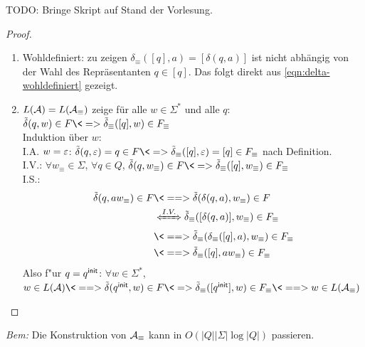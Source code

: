 TODO: Bringe Skript auf Stand der Vorlesung.

\begin{proof}\ 
        \begin{enumerate}
                \item Wohldefiniert: zu zeigen $\delta_\equiv([q],a) =[\delta(q,a)]$ ist nicht abhängig von der Wahl des Repräsentanten $q\in [q]$. Das folgt direkt aus \autoref{eqn:delta-wohldefiniert} gezeigt.
                \item $L(\mathcal{A})=L(\mathcal{A}_\equiv)$ zeige für alle $w\in\Sigma^*$ und alle $q$: $\tilde\delta(q,w)\in F \<=> \tilde\delta_\equiv([q],w)\in F_\equiv$\\
                Induktion über $w$:\\
                I.A. $w=\varepsilon$: $\tilde\delta(q,\Eps)=q\in F \<=> \tilde\delta_\equiv([q],\Eps)=[q]\in F_\equiv$ nach Definition.\\
                I.V.: $\forall w_\equiv\in\Sigma$, $\forall q\in Q$, $\tilde\delta(q,w_\equiv)\in F \<=> \tilde\delta_\equiv([q],w_\equiv)\in F_\equiv$\\
                I.S.: \begin{align*}
                \tilde\delta(q,aw_\equiv)\in F &\<==> \tilde\delta(\delta(q,a),w_\equiv)\in F\\ &\xLeftrightarrow{I.V.} \tilde\delta_\equiv([\delta(q,a)],w_\equiv)\in F_\equiv\\
                &\<==> \tilde\delta_\equiv(\delta_\equiv([q],a),w_\equiv)\in F_\equiv\\
                &\<==> \tilde\delta_\equiv([q],a w_\equiv)\in F_\equiv
                \end{align*}
                Also f"ur $q={q^\mathsf{init}}$: $\forall w\in\Sigma^*$, $w\in L(\A)\<==> \tilde\delta(\qinit,w) \in F \<=> \tilde\delta_\equiv([\qinit],w) \in F_\equiv \<==> w\in L(\A_\equiv)$
        \end{enumerate}
\end{proof}
\emph{Bem:} Die Konstruktion von $\mathcal{A}_\equiv$ kann in $O(|Q||\Sigma|\log|Q|)$ passieren.

